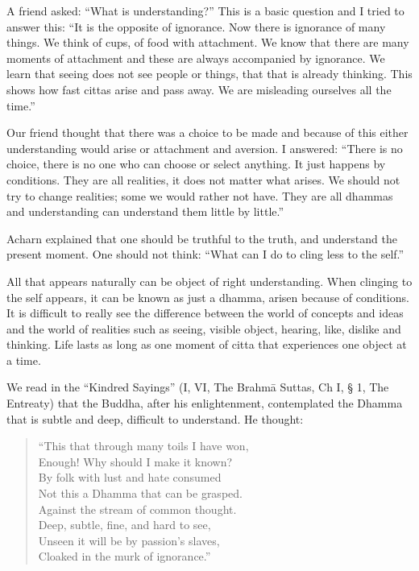 A friend asked: ``What is understanding?'' This is a basic question and
I tried to answer this: ``It is the opposite of ignorance. Now there is
ignorance of many things. We think of cups, of food with attachment. We
know that there are many moments of attachment and these are always
accompanied by ignorance. We learn that seeing does not see people or
things, that that is already thinking. This shows how fast cittas arise
and pass away. We are misleading ourselves all the time.''

Our friend thought that there was a choice to be made and because of
this either understanding would arise or attachment and aversion. I
answered: ``There is no choice, there is no one who can choose or select
anything. It just happens by conditions. They are all realities, it does
not matter what arises. We should not try to change realities; some we
would rather not have. They are all dhammas and understanding can
understand them little by little.''

Acharn explained that one should be truthful to the truth, and
understand the present moment. One should not think: ``What can I do to
cling less to the self.''

All that appears naturally can be object of right understanding. When
clinging to the self appears, it can be known as just a dhamma, arisen
because of conditions. It is difficult to really see the difference
between the world of concepts and ideas and the world of realities such
as seeing, visible object, hearing, like, dislike and thinking. Life
lasts as long as one moment of citta that experiences one object at a
time.

We read in the ``Kindred Sayings'' (I, VI, The Brahmā Suttas, Ch I, § 1,
The Entreaty) that the Buddha, after his enlightenment, contemplated the
Dhamma that is subtle and deep, difficult to understand. He thought:



\begin{verse}
``This that through many toils I have won,\\
Enough! Why should I make it known?\\
By folk with lust and hate consumed\\
Not this a Dhamma that can be grasped.\\
Against the stream of common thought.\\
Deep, subtle, fine, and hard to see,\\
Unseen it will be by passion's slaves,\\
Cloaked in the murk of ignorance.''\\
\end{verse}



